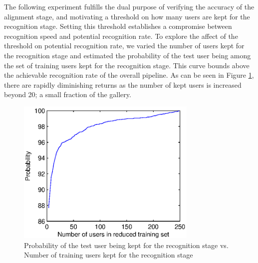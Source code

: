 \documentclass[10pt,twocolumn,letterpaper]{article}
\begin{document}
The following experiment fulfills the dual purpose of verifying the accuracy of
the alignment stage, and motivating a threshold on how many users are kept for
the recognition stage.  Setting this threshold establishes a compromise between
recognition speed and potential recognition rate.  To explore the affect of the
threshold on potential recognition rate, we varied the number of users kept for
the recognition stage and estimated the probability of the test user being
among the set of training users kept for the recognition stage.  This curve
bounds above the achievable recognition rate of the overall pipeline.  As can
be seen in Figure \ref{fig:user_alignment_rank_plot}, there are rapidly
diminishing returns as the number of kept users is increased beyond 20; a small
fraction of the gallery.
\begin{figure} 
\centering
\includegraphics[width=3.4in]{figures/user_alignment_rank_plot}
\caption{Probability of the test user being kept for the recognition stage vs.
Number of training users kept for the recognition stage}
\label{fig:user_alignment_rank_plot} \end{figure}
\end{document}
